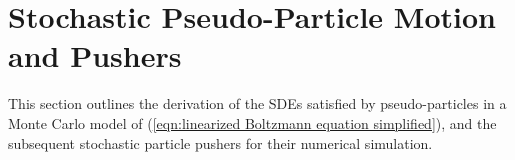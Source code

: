 \section{Stochastic Pseudo-Particle Motion and Pushers}\label{cha:particle motion}
    This section outlines the derivation of the SDEs satisfied by pseudo-particles in a Monte Carlo model of (\ref{eqn:linearized Boltzmann equation simplified}), and the subsequent stochastic particle pushers for their numerical simulation.


    
    
    
